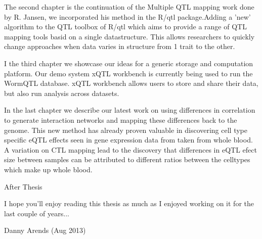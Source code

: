 The second chapter is the continuation of the Multiple QTL mapping work done by R. Jansen, we incorporated his 
method in the R/qtl package.Adding a 'new' algorithm to the QTL toolbox of R/qtl which aims to provide a range 
of QTL mapping tools basid on a single datastructure. This allows researchers to quickly change approaches when 
data varies in structure from 1 trait to the other.

I the third chapter we showcase our ideas for a generic storage and computation platform. Our demo system xQTL 
workbench is currently being used to run the WormQTL database. xQTL workbench allows users to store and share 
their data, but also run analysis across datasets.

In the last chapter we describe our latest work on using differences in correlation to generate interaction 
networks and mapping these differences back to the genome. This new method has already proven valuable in 
discovering cell type specific eQTL effects seen in gene expression data from taken from whole blood. A 
variation on CTL mapping lead to the discovery that differences in eQTL efect size between samples can be 
attributed to different ratios between the celltypes which make up whole blood.

After Thesis




I hope you'll enjoy reading this thesis as much as I enjoyed working on it for the last couple of years...

Danny Arends (Aug 2013)
